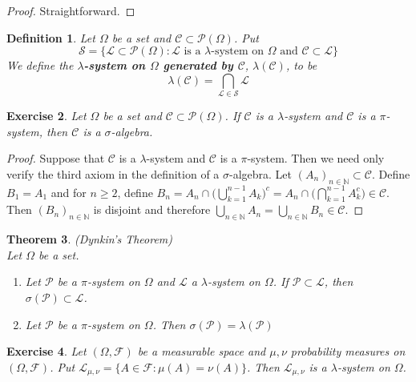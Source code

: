 \documentclass[12pt]{amsart}
\newtheorem{thm}{Theorem}[subsection]
\newtheorem{defn}[thm]{Definition}
\newtheorem{ex}[thm]{Exercise}
\newcommand{\lam}{\lambda}
\newcommand{\sig}{\sigma}
\newcommand{\Om}{\Omega}
\newcommand{\N}{\mathbb{N}}
\newcommand{\MC}{\mathcal{C}}
\newcommand{\MF}{\mathcal{F}}
\newcommand{\ML}{\mathcal{L}}
\newcommand{\MS}{\mathcal{S}}
\newcommand{\MP}{\mathcal{P}}
\begin{document}
\begin{proof}
	Straightforward.
\end{proof}

\begin{defn}
	Let $\Om$ be a set and $\MC \subset \MP(\Om)$. Put $$\MS = \{\ML \subset \MP(\Om): \ML \text{ is a }\lam\text{-system on }\Om \text{ and } \MC \subset \ML\}$$ We define the \textbf{$\lam$-system on $\Om$ generated by $\MC$}, $\lam(\MC)$, to be $$\lam(\MC) = \bigcap_{\ML \in \MS}\ML$$
\end{defn}

\begin{ex}
	Let $\Om$ be a set and $\MC \subset \MP(\Om)$. If $\MC$ is a $\lam$-system and $\MC$ is a $\pi$-system, then $\MC$ is a $\sig$-algebra.
\end{ex}

\begin{proof}
	Suppose that $\MC$ is a $\lam$-system and $\MC$ is a $\pi$-system. Then we need only verify the third axiom in the definition of a $\sig$-algebra. Let $(A_n)_{n \in \N} \subset \MC$. Define $B_1 = A_1$ and for $n \geq 2$, define $B_n = A_n \cap \bigg( \bigcup\limits_{k=1}^{n-1}A_k \bigg)^c = A_n \cap \bigg( \bigcap\limits_{k=1}^{n-1}A_k^c \bigg) \in \MC$. Then $(B_n)_{n \in \N}$ is disjoint and therefore $\bigcup\limits_{n \in \N}A_n = \bigcup\limits_{n \in \N}B_n \in \MC$.
\end{proof}

\begin{thm}(Dynkin's Theorem) \\
	Let $\Om$ be a set.
	\begin{enumerate}
		\item Let $\MP$ be a $\pi$-system on $\Om$ and $\ML$ a $\lam$-system on $\Om$. If $\MP \subset \ML$, then $\sig(\MP) \subset \ML$.
		\item Let $\MP$ be a $\pi$-system on $\Om$. Then $\sig(\MP) = \lam(\MP)$
	\end{enumerate} 
	
\end{thm}

\begin{ex}
	Let $(\Om, \MF)$ be a measurable space and $\mu, \nu$ probability measures on $(\Om, \MF)$. Put $\ML_{\mu,\nu} = \{A \in \MF: \mu(A) = \nu(A)\}$. Then $\ML_{\mu, \nu}$ is a $\lam$-system on $\Om$.
\end{ex}
\end{document}
